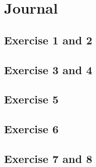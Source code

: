 \section{Journal}
\subsection{Exercise 1 and 2 }



\subsection{Exercise 3 and 4 }




\subsection{Exercise 5 }


\subsection{Exercise 6 }


\subsection{Exercise 7 and 8 }






